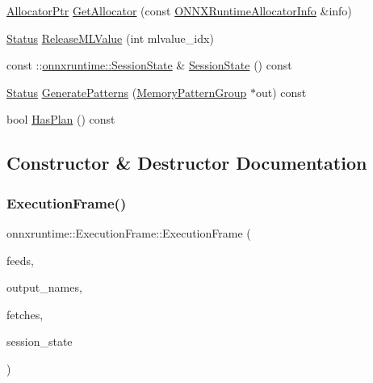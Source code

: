 \begin{DoxyCompactItemize}
\item 
\mbox{\hyperlink{namespaceonnxruntime_a6cdac724c5dcefded3a63f08dae58fda}{Allocator\+Ptr}} \mbox{\hyperlink{classonnxruntime_1_1ExecutionFrame_ac37c6f260ecd4c0c3231ddd2ce0da5fc}{Get\+Allocator}} (const \mbox{\hyperlink{structONNXRuntimeAllocatorInfo}{O\+N\+N\+X\+Runtime\+Allocator\+Info}} \&info)
\item 
\mbox{\hyperlink{classonnxruntime_1_1common_1_1Status}{Status}} \mbox{\hyperlink{classonnxruntime_1_1ExecutionFrame_af1bc334c5b33e50593b5b4604724eac6}{Release\+M\+L\+Value}} (int mlvalue\+\_\+idx)
\item 
const \+::\mbox{\hyperlink{classonnxruntime_1_1SessionState}{onnxruntime\+::\+Session\+State}} \& \mbox{\hyperlink{classonnxruntime_1_1ExecutionFrame_ad8c2bf7d42371d918c46390637fa7169}{Session\+State}} () const
\item 
\mbox{\hyperlink{classonnxruntime_1_1common_1_1Status}{Status}} \mbox{\hyperlink{classonnxruntime_1_1ExecutionFrame_a80bbb5fe5e837a6c10b5fd512f76c504}{Generate\+Patterns}} (\mbox{\hyperlink{structonnxruntime_1_1MemoryPatternGroup}{Memory\+Pattern\+Group}} $\ast$out) const
\item 
bool \mbox{\hyperlink{classonnxruntime_1_1ExecutionFrame_ad71f0d94ccc79c50cd0110f35fe90c4c}{Has\+Plan}} () const
\end{DoxyCompactItemize}


\subsection{Constructor \& Destructor Documentation}
\mbox{\label{classonnxruntime_1_1ExecutionFrame_a178fde48605c7e07f08f39d8aa8148f8}} 
\subsubsection{\texorpdfstring{Execution\+Frame()}{ExecutionFrame()}}
{\footnotesize\ttfamily onnxruntime\+::\+Execution\+Frame\+::\+Execution\+Frame (\begin{DoxyParamCaption}\item[{const std\+::unordered\+\_\+map$<$ std\+::string, \mbox{\hyperlink{classonnxruntime_1_1MLValue}{M\+L\+Value}} $>$ \&}]{feeds,  }\item[{const std\+::vector$<$ std\+::string $>$ \&}]{output\+\_\+names,  }\item[{const std\+::vector$<$ \mbox{\hyperlink{classonnxruntime_1_1MLValue}{M\+L\+Value}} $>$ \&}]{fetches,  }\item[{const \mbox{\hyperlink{classonnxruntime_1_1SessionState}{Session\+State}} \&}]{session\+\_\+state }\end{DoxyParamCaption})}

